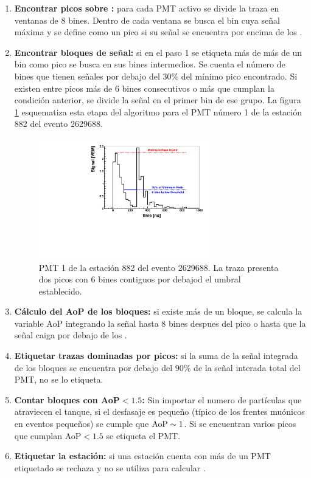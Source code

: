 	\begin{enumerate}
	 \item \textbf{Encontrar picos sobre :} para cada PMT activo se divide la traza en ventanas de 8 bines. Dentro de cada ventana se busca el bin cuya señal máxima y se define como un pico si su señal se encuentra por encima de los .
	 \item \textbf{Encontrar bloques de señal:} si en el paso 1 se etiqueta más de más de un bin como pico se busca en sus bines intermedios.
	 Se cuenta el número de bines que tienen señales por debajo del $30\%$ del mínimo pico encontrado. 
	 Si existen entre picos más de 6 bines consecutivos o más que cumplan la condición anterior, se divide la señal en el primer bin de ese grupo.
	 La figura \ref{fig:doublePeakEvent2} esquematiza esta etapa del algoritmo para el PMT número 1 de la estación 882 del evento 2629688.
	 \begin{figure}[ht]
	 \begin{center}
	 \includegraphics[width=0.7\textwidth]{fig/seleccionAuger/ev2629688_pmt1_anode}
	\caption{PMT 1 de la estación 882 del evento 2629688. La traza presenta dos picos con 6 bines contiguos por debajod el umbral establecido.}
	\label{fig:doublePeakEvent2}
	\end{center}
	\end{figure}
	 \item \textbf{Cálculo del AoP de los bloques:} si existe más de un bloque, se calcula la variable AoP integrando la señal hasta 8 bines despues del pico o hasta que la señal caiga por debajo de los .
	 \item \textbf{Etiquetar trazas dominadas por picos:} si la suma de la señal integrada de los bloques se encuentra por debajo del $90\%$ de la señal interada total del PMT, no se lo etiqueta.
	 \item \textbf{Contar bloques con AoP$<1.5$:} Sin importar el numero de partículas que atraviecen el tanque, si el desfasaje es pequeño (típico de los frentes muónicos en eventos pequeños) se cumple que ${\rm AoP}\sim 1$. Si se encuentran varios picos que cumplan AoP$<1.5$ se etiqueta el PMT.
	 \item \textbf{Etiquetar la estación:} si una estación cuenta con más de un PMT etiquetado se rechaza y no se utiliza para calcular \aop{}.
	\end{enumerate}

